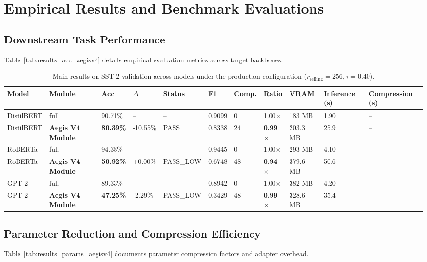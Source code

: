 \section{Empirical Results and Benchmark Evaluations}

\subsection{Downstream Task Performance}
Table~\ref{tab:results_acc_aegisv4} details empirical evaluation metrics across target backbones.

\begin{table}[t]
\centering
\small
\begin{tabular}{lllllllllll}
\toprule
\textbf{Model} & \textbf{Module} & \textbf{Acc} & \textbf{$\Delta$} & \textbf{Status} & \textbf{F1} & \textbf{Comp.} & \textbf{Ratio} & \textbf{VRAM} & \textbf{Inference (s)} & \textbf{Compression (s)} \\
\midrule
DistilBERT & full & 90.71\% & -- & -- & 0.9099 & 0 & 1.00$\times$ & 183 MB & 1.90 & -- \\
DistilBERT & \textbf{Aegis V4 Module} & \textbf{80.39\%} & -10.55\% & PASS & 0.8338 & 24 & \textbf{0.99$\times$} & 203.3 MB & 25.9 & -- \\
RoBERTa & full & 94.38\% & -- & -- & 0.9445 & 0 & 1.00$\times$ & 293 MB & 4.10 & -- \\
RoBERTa & \textbf{Aegis V4 Module} & \textbf{50.92\%} & +0.00\% & PASS_LOW & 0.6748 & 48 & \textbf{0.94$\times$} & 379.6 MB & 50.6 & -- \\
GPT-2 & full & 89.33\% & -- & -- & 0.8942 & 0 & 1.00$\times$ & 382 MB & 4.20 & -- \\
GPT-2 & \textbf{Aegis V4 Module} & \textbf{47.25\%} & -2.29\% & PASS_LOW & 0.3429 & 48 & \textbf{0.99$\times$} & 328.6 MB & 35.4 & -- \\
\bottomrule
\end{tabular}
\caption{Main results on SST-2 validation across models under the production configuration ($r_{\mathrm{ceiling}}=256, \tau=0.40$).}
\label{tab:main_sst2}
\end{table}

\subsection{Parameter Reduction and Compression Efficiency}
Table~\ref{tab:results_params_aegisv4} documents parameter compression factors and adapter overhead.

